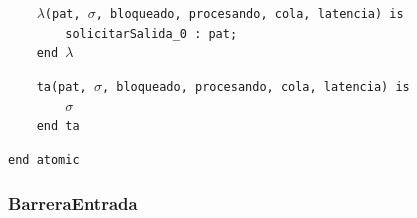 \documentclass[12pt]{article}
\begin{document}
\begin{tcolorbox}[
    colback=black!5!white,
    colframe=black!80!white,
    boxrule=0.8pt,
    arc=2pt,
    left=5pt,
    right=5pt,
    top=5pt,
    bottom=5pt,
    fontupper=\ttfamily,
    breakable
]
\begin{flushleft}
\texttt{~~~~}$\lambda$\texttt{(pat, }$\sigma$\texttt{, bloqueado, procesando, cola, latencia) is} \\
\texttt{~~~~~~~~solicitarSalida\_0 : pat;} \\
\texttt{~~~~end }$\lambda$
\end{flushleft}

\begin{flushleft}
\texttt{~~~~ta(pat, }$\sigma$\texttt{, bloqueado, procesando, cola, latencia) is} \\
\texttt{~~~~~~~~}$\sigma$ \\
\texttt{~~~~end ta}
\end{flushleft}

\begin{flushleft}
\texttt{end atomic}
\end{flushleft}
\end{tcolorbox}


\subsubsection{BarreraEntrada}
\end{document}
